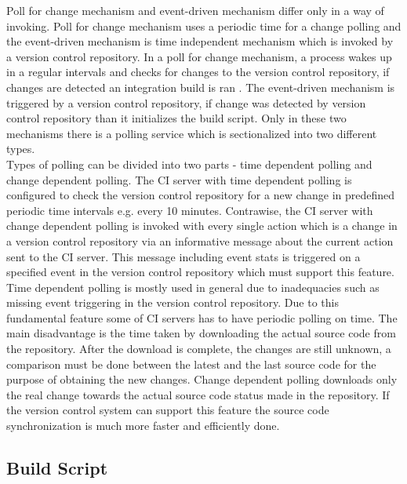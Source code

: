 Poll for change mechanism and event-driven mechanism differ only in a way of invoking. Poll for change mechanism uses a periodic time for a change polling and the event-driven mechanism is time independent mechanism which is invoked by a version control repository. In a poll for change mechanism, a process wakes up in a regular intervals and checks for changes to the version control repository, if changes are detected an integration build is ran \cite{CIbook}. The event-driven mechanism is triggered by a version control repository, if change was detected by version control repository than it initializes the build script. Only in these two mechanisms there is a polling service which is sectionalized into two different types.\\

Types of polling can be divided into two parts - time dependent polling and change dependent polling. The CI server with time dependent polling is configured to check the version control repository for a new change in predefined periodic time intervals e.g. every 10 minutes. Contrawise, the CI server with change dependent polling is invoked with every single action which is a change in a version control repository via an informative message about the current action sent to the CI server. This message including event stats is triggered on a specified event in the version control repository which must support this feature.\\

Time dependent polling is mostly used in general due to inadequacies such as missing event triggering in the version control repository. Due to this fundamental feature some of CI servers has to have  periodic polling on time. The main disadvantage is the time taken by downloading the actual source code from the repository. After the download is complete, the changes are still unknown, a comparison must be done between the latest and the last source code for the purpose of obtaining the new changes. Change dependent polling downloads only the real change towards the actual source code status made in the repository. If the version control system can support this feature the source code synchronization is much more faster and efficiently done.

\subsection{Build Script}\label{build_script}

